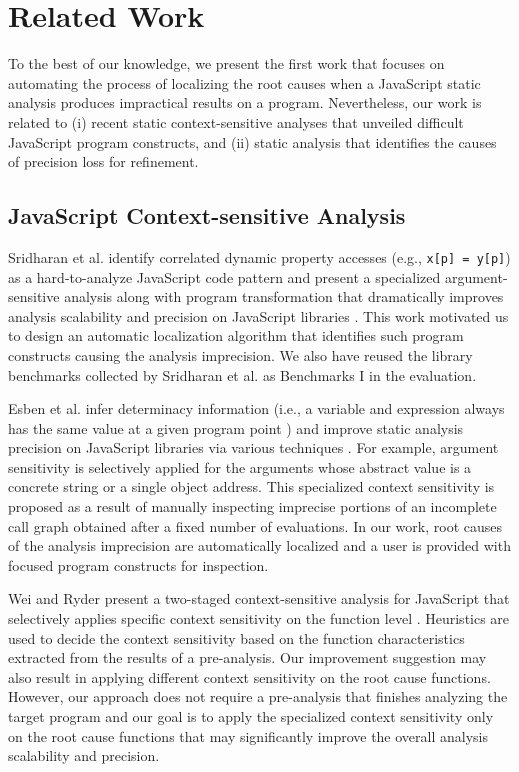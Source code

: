 \section{Related Work}
\label{related}

To the best of our knowledge, we present the first work that focuses on automating the process of localizing the root causes when a JavaScript static analysis produces impractical results on a program. Nevertheless, our work is related to (i) recent static context-sensitive analyses that unveiled difficult JavaScript program constructs, and (ii) static analysis that identifies the causes of precision loss for refinement.

\subsection{JavaScript Context-sensitive Analysis}

Sridharan et al. identify correlated dynamic property accesses (e.g., {\tt x[p] = y[p]}) as a hard-to-analyze JavaScript code pattern and present a specialized argument-sensitive analysis along with program transformation that dramatically improves analysis scalability and precision on JavaScript libraries \cite{Sridharan:2012:CTP:2367163.2367191}. This work motivated us to design an automatic localization algorithm that identifies such program constructs causing the analysis imprecision. We also have reused the library benchmarks collected by Sridharan et al. \cite{Sridharan:2012:CTP:2367163.2367191} as Benchmarks I in the evaluation.

Esben et al. infer determinacy information (i.e., a variable and expression always has the same value at a given program point \cite{Schafer:2013:DDA:2491956.2462168}) and improve static analysis precision on JavaScript libraries via various techniques \cite{Andreasen:2014:DSA:2660193.2660214}. For example, argument sensitivity is selectively applied for the arguments whose abstract value is a concrete string or a single object address. This specialized context sensitivity is proposed as a result of manually inspecting imprecise portions of an incomplete call graph obtained after a fixed number of evaluations. In our work, root causes of the analysis imprecision are automatically localized and a user is provided with focused program constructs for inspection.

Wei and Ryder present a two-staged context-sensitive analysis for JavaScript that selectively applies specific context sensitivity on the function level \cite{DBLP:conf/ecoop/WeiR15}. Heuristics are used to decide the context sensitivity based on the function characteristics extracted from the results of a pre-analysis. Our improvement suggestion may also result in applying different context sensitivity on the root cause functions. However, our approach does not require a pre-analysis that finishes analyzing the target program and our goal is to apply the specialized context sensitivity only on the root cause functions that may significantly improve the overall analysis scalability and precision.

